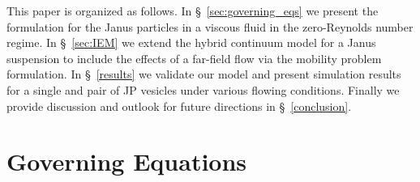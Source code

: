 \documentclass[lineno]{jfm}
\begin{document}
This paper is organized as follows. In \S~\ref{sec:governing_eqs} we
present the formulation for the Janus particles in a viscous fluid in
the zero-Reynolds number regime. In \S~\ref{sec:IEM} we extend the
hybrid continuum model for a Janus suspension to include the effects of
a far-field flow via the mobility problem formulation. In
\S~\ref{results} we validate our model and present simulation results
for a single and pair of JP vesicles under various flowing conditions.
Finally we provide discussion and outlook for future directions in
\S~\ref{conclusion}.

\section{Governing Equations\label{sec:governing_eqs}}
\end{document}
